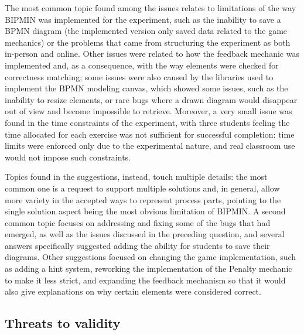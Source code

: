 The most common topic found among the issues relates to limitations of the way BIPMIN was implemented for the experiment, such as the inability to save a BPMN diagram (the implemented version only saved data related to the game mechanics) or the problems that came from structuring the experiment as both in-person and online. Other issues were related to how the feedback mechanic was implemented and, as a consequence, with the way elements were checked for correctness matching; some issues were also caused by the libraries used to implement the BPMN modeling canvas, which showed some issues, such as the inability to resize elements, or rare bugs where a drawn diagram would disappear out of view and become impossible to retrieve. Moreover, a very small issue was found in the time constraints of the experiment, with three students feeling the time allocated for each exercise was not sufficient for successful completion: time limits were enforced only due to the experimental nature, and real classroom use would not impose such constraints.

Topics found in the suggestions, instead, touch multiple details: the most common one is a request to support multiple solutions and, in general, allow more variety in the accepted ways to represent process parts, pointing to the single solution aspect being the most obvious limitation of BIPMIN. A second common topic focuses on addressing and fixing some of the bugs that had emerged, as well as the issues discussed in the preceding question, and several answers specifically suggested adding the ability for students to save their diagrams. Other suggestions focused on changing the game implementation, such as adding a hint system, reworking the implementation of the Penalty mechanic to make it less strict, and expanding the feedback mechanism so that it would also give explanations on why certain elements were considered correct.






\subsection{Threats to validity}


